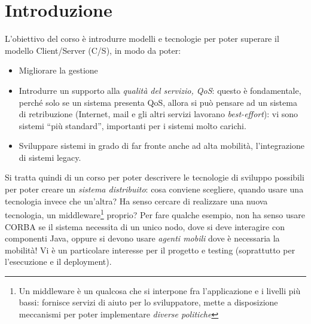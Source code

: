 \chapter{Introduzione}
L'obiettivo del corso è introdurre modelli e tecnologie per poter superare il 
modello Client/Server (C/S), in modo
da poter:
\begin{itemize}
 \item Migliorare la gestione
 \item Introdurre un supporto alla \textit{qualità del servizio, QoS}: questo è fondamentale, perché solo se un sistema
 presenta QoS, allora si può pensare ad un sistema di retribuzione (Internet, mail e gli altri servizi
lavorano \textit{best-effort}): vi sono sistemi ``più standard'', importanti per i sistemi molto carichi.
\item Sviluppare sistemi in grado di far fronte anche ad alta mobilità, l'integrazione di sistemi legacy.
\end{itemize}
Si tratta quindi di un corso per poter descrivere le tecnologie di sviluppo possibili per poter creare un
\textit{sistema distribuito}: cosa conviene scegliere, quando usare una tecnologia invece che un'altra? Ha senso cercare
di realizzare una nuova tecnologia, un middleware\footnote{Un middleware è un qualcosa che si interpone fra
l'applicazione e i livelli più bassi: fornisce servizi di aiuto per lo sviluppatore, mette a disposizione meccanismi per
poter implementare \textit{diverse politiche}} proprio? Per fare qualche esempio, non ha senso usare CORBA se il sistema
necessita di un unico nodo, dove si deve interagire con componenti Java, oppure si devono usare \textit{agenti mobili}
dove è necessaria la mobilità! Vi è un particolare interesse per il progetto e testing (soprattutto per l'esecuzione e
il deployment).